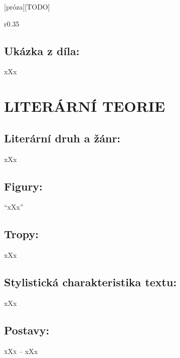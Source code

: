 \documentclass{extarticle} %
\begin{document}
\newpage


\changefontsize{8pt}

[próza][TODO]

\noindent\begin{wrapfigure}{r}{0.35\textwidth}
\tiny

\subsection*{Ukázka z díla:}
\setlength{\parindent}{3pt}
xXx
\end{wrapfigure}

\section*{LITERÁRNÍ TEORIE}

\subsection*{Literární druh a žánr:}
\noindent xXx



\subsection*{Figury:}
\noindent 
\enquote{xXx}

\subsection*{Tropy:}
\noindent 
xXx

\subsection*{Stylistická charakteristika textu:}
\noindent 
xXx

\subsection*{Postavy:}
\noindent 
\textsc{xXx --} xXx \\
\end{document}
